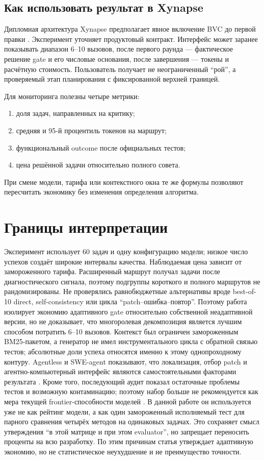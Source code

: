 \documentclass[11pt]{article}
\begin{document}
\subsection{Как использовать результат в Xynapse}

Дипломная архитектура Xynapse предполагает явное включение BVC до первой
правки \cite{khalilov2026}. Эксперимент уточняет продуктовый контракт.
Интерфейс может заранее показывать диапазон 6--10 вызовов, после первого
раунда --- фактическое решение gate и его числовые основания, после
завершения --- токены и расчётную стоимость. Пользователь получает не
неограниченный \enquote{рой}, а проверяемый этап планирования с фиксированной
верхней границей.

Для мониторинга полезны четыре метрики:
\begin{enumerate}
  \item доля задач, направленных на критику;
  \item средняя и 95-й процентиль токенов на маршрут;
  \item функциональный outcome после официальных тестов;
  \item цена решённой задачи относительно полного совета.
\end{enumerate}
При смене модели, тарифа или контекстного окна те же формулы позволяют
пересчитать экономику без изменения определения алгоритма.

\section{Границы интерпретации}

Эксперимент использует 60 задач и одну конфигурацию модели; низкое число
успехов создаёт широкие интервалы качества. Наблюдаемая цена зависит от
замороженного тарифа. Расширенный маршрут получал задачи после диагностического
сигнала, поэтому подгруппы короткого и полного маршрутов не рандомизированы.
Не проверялись равнобюджетные альтернативы вроде best-of-10 direct,
self-consistency или цикла \enquote{patch--ошибка--повтор}. Поэтому работа
изолирует экономию адаптивного gate относительно собственной неадаптивной
версии, но не доказывает, что многоролевая декомпозиция является лучшим способом
потратить 6--10 вызовов. Контекст был ограничен замороженным BM25-пакетом, а
генератор не имел инструментального цикла с обратной связью тестов; абсолютные
доли успеха относятся именно к этому однопроходному контуру. Agentless и
SWE-agent показывают, что локализация, отбор patch и агентно-компьютерный
интерфейс являются самостоятельными факторами результата
\cite{xia2024agentless,yang2024sweagent}.
Кроме того, последующий аудит \dataset{} показал остаточные проблемы тестов
и возможную контаминацию; поэтому набор больше не рекомендуется как мера
текущей frontier-способности моделей \cite{openai2026verifiedlimits}. В
данной работе он используется уже не как рейтинг модели, а как один
замороженный исполняемый тест для парного сравнения четырёх методов на
одинаковых задачах. Это сохраняет смысл утверждения
\enquote{в этой матрице и при этом evaluator}, но запрещает переносить
проценты на всю разработку. По этим причинам статья утверждает адаптивную
экономию, но не статистическое неухудшение и не преимущество точности.
\end{document}
